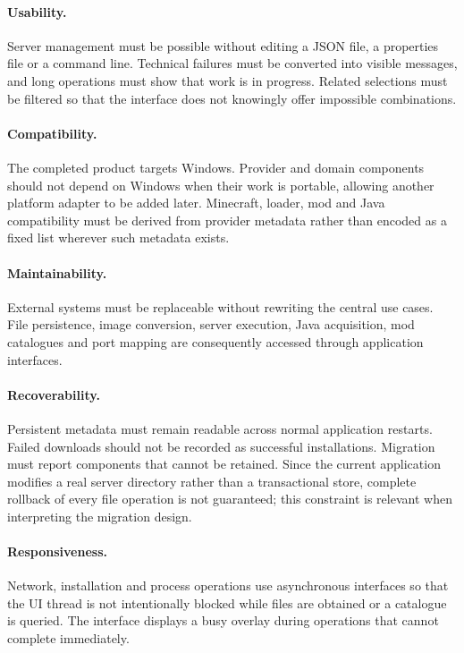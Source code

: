 \paragraph{Usability.} Server management must be possible without editing a JSON file, a properties file or a command line. Technical failures must be converted into visible messages, and long operations must show that work is in progress. Related selections must be filtered so that the interface does not knowingly offer impossible combinations.

\paragraph{Compatibility.} The completed product targets Windows. Provider and domain components should not depend on Windows when their work is portable, allowing another platform adapter to be added later. Minecraft, loader, mod and Java compatibility must be derived from provider metadata rather than encoded as a fixed list wherever such metadata exists.

\paragraph{Maintainability.} External systems must be replaceable without rewriting the central use cases. File persistence, image conversion, server execution, Java acquisition, mod catalogues and port mapping are consequently accessed through application interfaces.

\paragraph{Recoverability.} Persistent metadata must remain readable across normal application restarts. Failed downloads should not be recorded as successful installations. Migration must report components that cannot be retained. Since the current application modifies a real server directory rather than a transactional store, complete rollback of every file operation is not guaranteed; this constraint is relevant when interpreting the migration design.

\paragraph{Responsiveness.} Network, installation and process operations use asynchronous interfaces so that the \acs{UI} thread is not intentionally blocked while files are obtained or a catalogue is queried. The interface displays a busy overlay during operations that cannot complete immediately.

